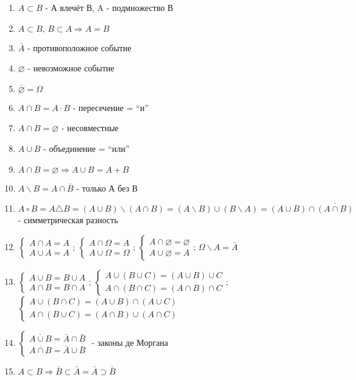 \begin{enumerate}
\item $A \subset B$ - А влечёт В, A - подмножество В
\item $A\subset B,\,B\subset A \Rightarrow A=B$
\item $\bar{A}$ - противоположное событие
\item $\varnothing$ - невозможное событие
\item $\bar{\varnothing}=\Omega$
\item $A\cap B = A\cdot B$ - пересечение = ``и''
\item $A\cap B = \varnothing$ - несовместные
\item $A\cup B$ - объединение = ``или''
\item $A\cap B=\varnothing \Rightarrow A\cup B = A+B$
\item $A\backslash B = A\cap\bar{B}$ - только А без В
\item $A \circ B = A\triangle B = (A\cup B)\backslash(A\cap B) =(A\backslash B)\cup(B\backslash A)=(A\cup B)\cap\overline{(A\cap B)} $ - симметрическая разность
\item $\left\{\begin{array}{l}A\cap A=A\\ A\cup A=A\end{array}\right.$;
      $\left\{\begin{array}{l}A\cap \Omega=A\\ A\cup \Omega=\Omega\end{array}\right.$;
      $\left\{\begin{array}{l}A\cap \varnothing=\varnothing\\ A\cup \varnothing=A\end{array}\right.$;
      $ \Omega\backslash A=\bar{A} $
\item $\left\{\begin{array}{l} A\cup B = B\cup A\\A\cap B = B\cap A\end{array}\right.$;
      $\left\{\begin{array}{l} A\cup(B\cup C)=(A\cup B)\cup C \\ A\cap(B\cap C)=(A\cap B)\cap C \end{array}\right.$;
      $\left\{\begin{array}{l} A\cup(B\cap C)=(A\cup B)\cap(A\cup C)\\A\cap(B\cup C)=(A\cap B)\cup(A\cap C)\end{array}\right.$
\item $\left\{\begin{array}{l} \overline{A\cup B}=\bar{A}\cap\bar{B}\\\overline{A\cap B}=\bar{A}\cup\bar{B}\end{array}\right.$ - законы де Моргана
\item $A\subset B\Rightarrow\bar{B}\subset\bar{A}=\bar{A}\supset\bar{B}$
\end{enumerate}
